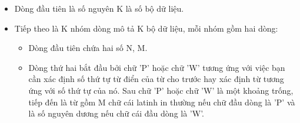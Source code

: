 \begin{itemize}
	\item     Dòng đầu tiên là số nguyên K là số bộ dữ liệu.   
	\item     Tiếp theo là K nhóm dòng mô tả K bộ dữ liệu, mỗi nhóm gồm hai dòng:    
\begin{itemize}
	\item       Dòng đầu tiên chứa hai số N, M.     
	\item       Dòng thứ hai bắt đầu bởi chữ 'P' hoặc chữ 'W' tương ứng với việc bạn cần xác định số thứ tự từ điển của từ cho trước hay xác định từ tương ứng với số thứ tự của nó. Sau chữ 'P' hoặc chữ 'W' là một khoảng trống, tiếp đến là từ gồm M chữ cái latinh in thường nếu chữ đầu dòng là 'P' và là số nguyên dương nếu chữ cái đầu dòng là 'W'.     
\end{itemize}
\end{itemize}
